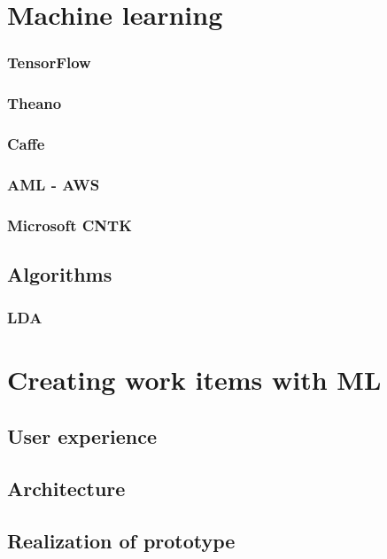 \documentclass[thesis=M,english]{FITthesis}[2012/06/26]
\begin{document}
\chapter{Machine learning}



\subsection{TensorFlow}

\subsection{Theano}

\subsection{Caffe}

\subsection{AML - AWS}

\subsection{Microsoft CNTK}

\section{Algorithms}

\subsection{LDA}

\chapter{Creating work items with ML}

\section{User experience}

\section{Architecture}

\section{Realization of prototype}
\end{document}
